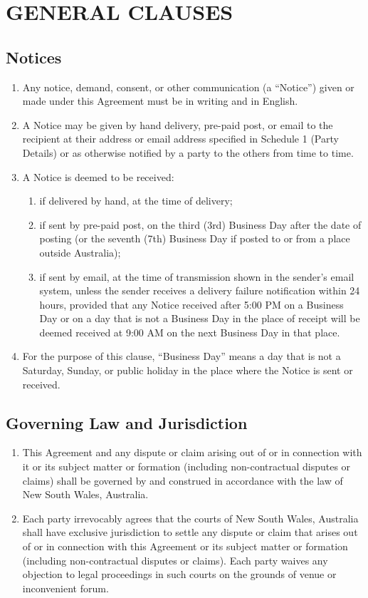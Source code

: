 \section{GENERAL CLAUSES} \label{sec:general_clauses}

\subsection{Notices}
\begin{enumerate}[label=(\alph*)]
\item Any notice, demand, consent, or other communication (a ``Notice'') given or made under this Agreement must be in writing and in English.
\item A Notice may be given by hand delivery, pre-paid post, or email to the recipient at their address or email address specified in Schedule 1 (Party Details) or as otherwise notified by a party to the others from time to time.
\item A Notice is deemed to be received:
    \begin{enumerate}[label=(\roman*)]
    \item if delivered by hand, at the time of delivery;
    \item if sent by pre-paid post, on the third (3rd) Business Day after the date of posting (or the seventh (7th) Business Day if posted to or from a place outside Australia);
    \item if sent by email, at the time of transmission shown in the sender's email system, unless the sender receives a delivery failure notification within 24 hours, provided that any Notice received after 5:00 PM on a Business Day or on a day that is not a Business Day in the place of receipt will be deemed received at 9:00 AM on the next Business Day in that place.
    \end{enumerate}
\item For the purpose of this clause, ``Business Day'' means a day that is not a Saturday, Sunday, or public holiday in the place where the Notice is sent or received.
\end{enumerate}

\subsection{Governing Law and Jurisdiction}
\begin{enumerate}[label=(\alph*)]
\item This Agreement and any dispute or claim arising out of or in connection with it or its subject matter or formation (including non-contractual disputes or claims) shall be governed by and construed in accordance with the law of New South Wales, Australia.
\item Each party irrevocably agrees that the courts of New South Wales, Australia shall have exclusive jurisdiction to settle any dispute or claim that arises out of or in connection with this Agreement or its subject matter or formation (including non-contractual disputes or claims). Each party waives any objection to legal proceedings in such courts on the grounds of venue or inconvenient forum.
\end{enumerate}

